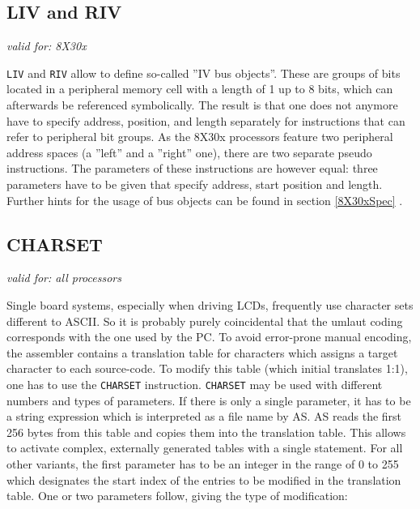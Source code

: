 \documentclass[12pt,twoside]{report}
\makeatletter
\newcommand{\tty}[1]{{\tt #1}}
\newcommand{\ttindex}[1]{\index{#1@{\tt #1}}}
\makeatother
\begin{document}

\subsection{LIV and RIV}
\ttindex{LIV}\ttindex{RIV}

{\em valid for: 8X30x}

\tty{LIV} and \tty{RIV} allow to define so-called ''IV bus objects''.
These are
groups of bits located in a peripheral memory cell with a length of 1
up to 8 bits, which can afterwards be referenced symbolically.  The
result is that one does not anymore have to specify address,
position, and length separately for instructions that can refer to
peripheral bit groups.  As the 8X30x processors feature two
peripheral address spaces (a ''left'' and a ''right'' one), there are two
separate pseudo instructions.  The parameters of these instructions
are however equal: three parameters have to be given that specify
address, start position and length.  Further hints for the usage of
bus objects can be found in section \ref{8X30xSpec} .


\subsection{CHARSET}
\ttindex{CHARSET}

{\em valid for: all processors}

Single board systems, especially when driving LCDs, frequently use
character sets different to ASCII.  So it is probably purely coincidental
that the umlaut coding corresponds with the one used by the PC.  To avoid
error-prone manual encoding, the assembler contains a translation table
for characters which assigns a target character to each source-code.  To
modify this table (which initial translates 1:1), one has to use the
\tty{CHARSET} instruction.  \tty{CHARSET} may be used with different
numbers and types of parameters.  If there is only a single parameter, it
has to be a string expression which is interpreted as a file name by AS.
AS reads the first 256 bytes from this table and copies them into the
translation table.  This allows to activate complex, externally generated
tables with a single statement.  For all other variants, the first
parameter has to be an integer in the range of 0 to 255 which designates
the start index of the entries to be modified in the translation table.
One or two parameters follow, giving the type of modification:
\end{document}
